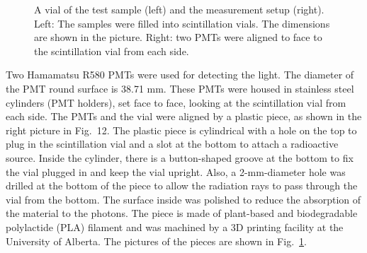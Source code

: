 \begin{figure}[htbp]
	\caption[A vial of the test sample and the measurement setup.]{A vial of the test sample (left) and the measurement setup (right). Left: The samples were filled into scintillation vials. The dimensions are shown in the picture. Right: two PMTs were aligned to face to the scintillation vial from each side.}
	\label{scintVial}
\end{figure}

Two Hamamatsu R580 PMTs \cite{pmtR580} were used for detecting the light. The diameter of the PMT round surface is 38.71 mm. These PMTs were housed in stainless steel cylinders (PMT holders), set face to face, looking at the scintillation vial from each side. The PMTs and the vial were aligned by a plastic piece, as shown in the right picture in Fig.~12.  The plastic piece is cylindrical with a hole on the top to plug in the scintillation vial and a slot at the bottom to attach a radioactive source. Inside the cylinder, there is a button-shaped groove at the bottom to fix the vial plugged in and keep the vial upright. Also, a 2-mm-diameter hole was drilled at the bottom of the piece to allow the radiation rays to pass through the vial from the bottom. The surface inside was polished to reduce the absorption of the material to the photons. The piece is made of plant-based and biodegradable polylactide (PLA) filament and was machined by a 3D printing facility at the University of Alberta. The pictures of the pieces are shown in Fig.~\ref{scintVial}.

